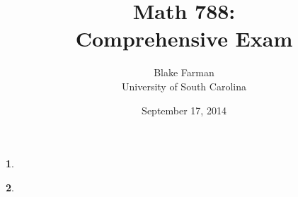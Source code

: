 \documentclass[10pt]{amsart}
\author{Blake Farman\\University of South Carolina}
\title{Math 788:\\Comprehensive Exam}
\date{September 17, 2014}
\begin{document}
\maketitle

\providecommand{\Tr}[2]{\operatorname{Tr}_{#1}\left(#2\right)}
\providecommand{\p}{\mathfrak{p}}
\providecommand{\m}{\mathfrak{m}}
\providecommand{\Deck}[1]{\operatorname{Deck}\left(#1\right)}
\newtheorem{thm}{}
\newtheorem{lem}{Lemma}
\newtheorem{prop}{Proposition}
\theoremstyle{definition}
\newtheorem{defn}{Definition}[thm]

\newcommand{\A}{\mathbb{A}}

\begin{thm}\label{Ex1}
\end{thm}

\begin{thm}\label{Ex2}
\end{thm}
\end{document}
